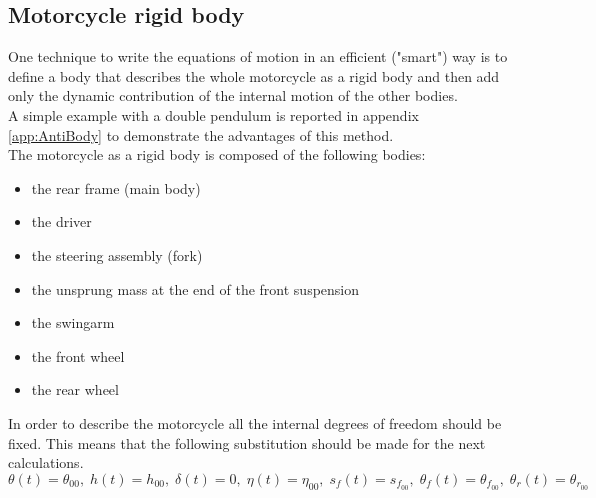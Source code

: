 \subsection{Motorcycle rigid body}
%
One technique to write the equations of motion in an efficient ("smart") way is to define a body that describes the whole motorcycle as a rigid body and then add only the dynamic contribution of the internal motion of the other bodies.\\
A simple example with a double pendulum is reported in appendix \ref{app:AntiBody} to demonstrate the advantages of this method.\\
The motorcycle as a rigid body is composed of the following bodies:
\begin{itemize}
    \setlength{\itemsep}{0pt}
    \item the rear frame (main body)
    \item the driver
    \item the steering  assembly (fork)
    \item the unsprung mass at the end of the front suspension
    \item the swingarm
    \item the front wheel
    \item the rear wheel
\end{itemize}
%
In order to describe the motorcycle all the internal degrees of freedom should be fixed. This means that the following substitution should be made for the next calculations.
%
\begin{equation*}
    \theta \left( t \right) =\theta_{00},\;h
    \left( t \right) =h_{00},\;\delta \left( t \right) =0,\;\eta \left( t
    \right) =\eta_{00},\;s_{f} \left( t \right) =s_{f_{00}},\;\theta_{f}
    \left( t \right) =\theta_{f_{00}},\;\theta_{r} \left( t \right) =\theta
   _{r_{00}}   
\end{equation*}
%
